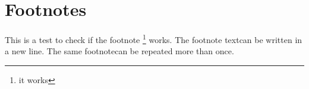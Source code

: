 \documentclass[12pt]{article}
\begin{document}
\section{Footnotes}

This is a test to check if the footnote \footnote[10]{it works} works. The footnote text\footnotemark can be written in a new line. 
The same footnote\footnotemark can be repeated more than once\footnotemark[\value{footnote}]. 
\end{document}
